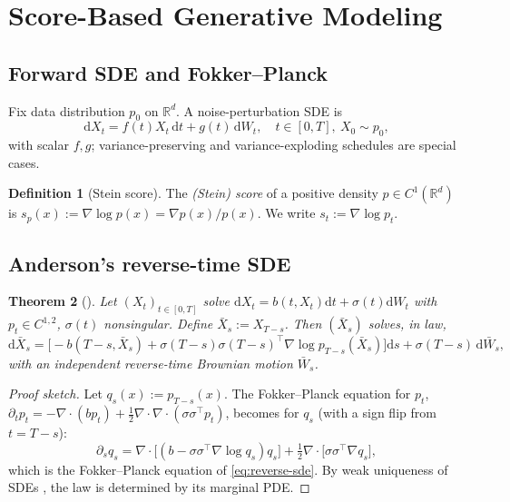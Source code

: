 \documentclass[11pt,letterpaper]{article}
\theoremstyle{plain}
\newtheorem{theorem}{Theorem}[section]
\theoremstyle{definition}
\newtheorem{definition}[theorem]{Definition}
\theoremstyle{remark}
\newcommand{\R}{\mathbb{R}}
\newcommand{\dd}{\mathrm{d}}
\newcommand{\grad}{\nabla}
\newcommand{\divg}{\nabla\cdot}
\begin{document}
\section{Score-Based Generative Modeling}\label{app:score}

\subsection{Forward SDE and Fokker--Planck}

Fix data distribution $p_0$ on $\R^d$. A noise-perturbation SDE is
\begin{equation}
  \dd X_t=f(t)X_t\,\dd t+g(t)\,\dd W_t,\quad t\in[0,T],\ X_0\sim p_0,
  \label{eq:vpsde}
\end{equation}
with scalar $f,g$; variance-preserving and variance-exploding schedules
\citep{song2021score} are special cases.

\begin{definition}[Stein score]
The \emph{(Stein) score} of a positive density $p\in C^1(\R^d)$ is
$s_p(x):=\grad\log p(x)=\grad p(x)/p(x)$. We write $s_t:=\grad\log p_t$.
\end{definition}

\subsection{Anderson's reverse-time SDE}

\begin{theorem}[\citealt{anderson1982reverse}]\label{thm:anderson}
Let $(X_t)_{t\in[0,T]}$ solve $\dd X_t=b(t,X_t)\dd t+\sigma(t)\dd W_t$ with
$p_t\in C^{1,2}$, $\sigma(t)$ nonsingular. Define $\bar X_s:=X_{T-s}$. Then
$(\bar X_s)$ solves, in law,
\begin{equation}
  \dd\bar X_s=\bigl[-b(T-s,\bar X_s)+\sigma(T-s)\sigma(T-s)^\top\grad\log p_{T-s}(\bar X_s)\bigr]\dd s
  +\sigma(T-s)\,\dd\bar W_s,
  \label{eq:reverse-sde}
\end{equation}
with an independent reverse-time Brownian motion $\bar W_s$.
\end{theorem}
\begin{proof}[Proof sketch]
Let $q_s(x):=p_{T-s}(x)$. The Fokker--Planck equation for $p_t$,
$\partial_tp_t=-\divg(bp_t)+\tfrac12\divg\divg(\sigma\sigma^\top p_t)$,
becomes for $q_s$ (with a sign flip from $t=T-s$):
\[
  \partial_s q_s=\divg\!\bigl[(b-\sigma\sigma^\top\grad\log q_s)q_s\bigr]
               +\tfrac12\divg\bigl[\sigma\sigma^\top\grad q_s\bigr],
\]
which is the Fokker--Planck equation of \eqref{eq:reverse-sde}.
By weak uniqueness of SDEs \citep[Cor.~5.3.23]{karatzas1991bm}, the law is
determined by its marginal PDE.
\end{proof}
\end{document}
